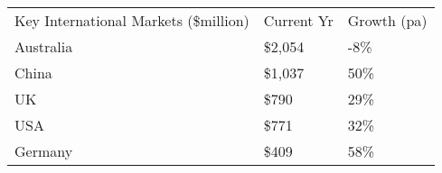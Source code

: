 \begin{tabular}[t]{p{5.1cm}>{\hfill}p{1.1cm}>{\hfill}p{1.3cm}}
 Key International Markets (\$million) & Current Yr & Growth (pa) \\ 
 Australia & \$2,054 & -8\% \\ 
  China & \$1,037 & 50\% \\ 
  UK & \$790   & 29\% \\ 
  USA & \$771   & 32\% \\ 
  Germany & \$409   & 58\% \\ 
  \end{tabular}
